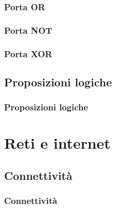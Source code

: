 \documentclass[11pt,fleqn]{book}
\begin{document}
\section{Porta OR}
\section{Porta NOT}
\section{Porta XOR}



\chapter{Proposizioni logiche}

\section{Proposizioni logiche}



\part{Reti e internet}


\chapter{Connettività}

\section{Connettività}

\end{document}
